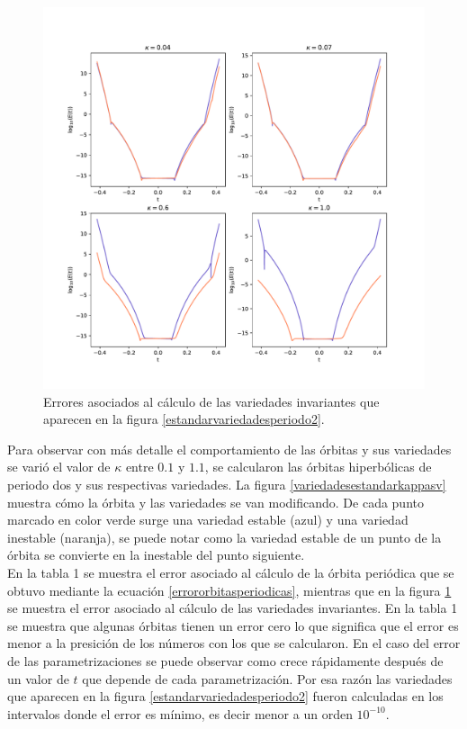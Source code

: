 \begin{figure}
	\centering
	\includegraphics[scale=0.7]{erroresvariedadesestandarperiodo2}
	\caption{Errores asociados al c\'alculo de las variedades invariantes que aparecen en la figura \ref{estandarvariedadesperiodo2}.}
	\label{erroresvariedadesestandarperiodo2}
\end{figure}

Para observar con m\'as detalle el comportamiento de las \'orbitas y sus variedades se vari\'o el valor de $\kappa$ entre $0.1$ y $1.1$, se calcularon las \'orbitas hiperb\'olicas de periodo dos y sus respectivas variedades. La figura  \ref{variedadesestandarkappasv} muestra c\'omo la \'orbita y las variedades se van modificando. De cada punto marcado en color verde surge una variedad estable (azul) y una variedad inestable (naranja), se puede notar como la variedad estable de un punto de la \'orbita se convierte en la inestable del punto siguiente.\\

En la tabla 1 se muestra el error asociado al c\'alculo de la \'orbita peri\'odica que se obtuvo mediante la ecuaci\'on  \eqref{errororbitasperiodicas}, mientras que en la figura \ref{erroresvariedadesestandarperiodo2} se muestra el error asociado al c\'alculo de las variedades invariantes. En la tabla 1 se muestra que algunas \'orbitas tienen un error cero lo que significa que el error es menor a la presici\'on de los n\'umeros con los que se calcularon.  En el caso del error de las parametrizaciones se puede observar como crece r\'apidamente despu\'es de un valor de $t$ que depende de cada parametrizaci\'on. Por esa raz\'on las variedades que aparecen en la figura \ref{estandarvariedadesperiodo2} fueron calculadas en los intervalos donde el error es m\'inimo, es decir menor a  un orden $10^{-10}$. 

